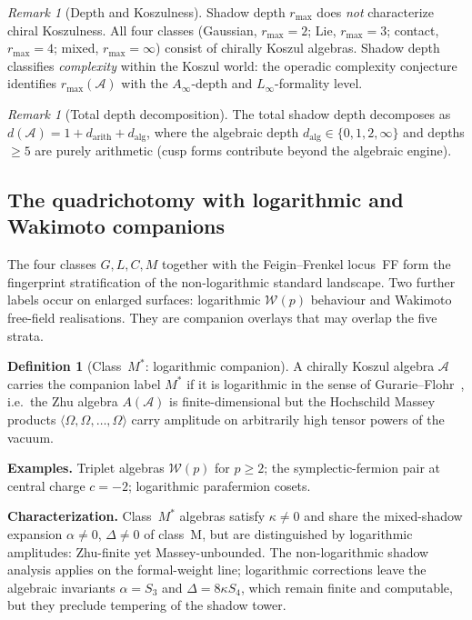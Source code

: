 \documentclass[11pt]{article}
\theoremstyle{plain}
\theoremstyle{definition}
\newtheorem{definition}[theorem]{Definition}
\theoremstyle{remark}
\newtheorem{remark}[theorem]{Remark}
\providecommand{\cA}{\mathcal{A}}
\providecommand{\cW}{\mathcal{W}}
\begin{document}
\medskip

\begin{remark}[Depth and Koszulness]\label{rem:depth-vs-koszulness}
Shadow depth $r_{\max}$ does \emph{not} characterize chiral Koszulness.
All four classes (Gaussian, $r_{\max} = 2$; Lie, $r_{\max} = 3$;
contact, $r_{\max} = 4$; mixed, $r_{\max} = \infty$) consist
of chirally Koszul algebras. Shadow depth classifies \emph{complexity}
within the Koszul world: the operadic complexity conjecture identifies
$r_{\max}(\cA)$ with the $A_\infty$-depth and $L_\infty$-formality level.
\end{remark}

\begin{remark}[Total depth decomposition]\label{rem:total-depth}
The total shadow depth decomposes as
$d(\cA) = 1 + d_{\mathrm{arith}} + d_{\mathrm{alg}}$, where the algebraic depth
$d_{\mathrm{alg}} \in \{0, 1, 2, \infty\}$ and depths $\geq 5$ are
purely arithmetic (cusp forms contribute beyond the algebraic engine).
\end{remark}

\subsection{The quadrichotomy with logarithmic and Wakimoto
companions}
\label{ssec:quadrichotomy-with-companions}

The four classes $G, L, C, M$ together with the Feigin--Frenkel
locus~FF form the fingerprint stratification of the non-logarithmic
standard landscape. Two further labels occur on enlarged surfaces:
logarithmic $\cW(p)$ behaviour and Wakimoto free-field realisations.
They are companion overlays that may overlap the five strata.

\begin{definition}[Class~$M^\ast$: logarithmic companion]
\label{def:class-M-star}
A chirally Koszul algebra $\cA$ carries the companion label
$M^\ast$ if it is logarithmic in the sense of
Gurarie--Flohr~\cite{Gurarie1993,Flohr1996}, i.e.\ the Zhu
algebra $A(\cA)$ is finite-dimensional but the Hochschild Massey
products $\langle \Omega, \Omega, \ldots, \Omega \rangle$ carry
amplitude on arbitrarily high tensor powers of the vacuum.
\end{definition}

\noindent\textbf{Examples.} Triplet algebras $\cW(p)$ for $p \geq
2$; the symplectic-fermion pair at central charge $c = -2$;
logarithmic parafermion cosets.

\noindent\textbf{Characterization.}
Class~$M^\ast$ algebras satisfy $\kappa \neq 0$ and share the
mixed-shadow expansion $\alpha \neq 0$, $\Delta \neq 0$ of
class~M, but are distinguished by logarithmic amplitudes:
Zhu-finite yet Massey-unbounded. The non-logarithmic shadow
analysis applies on the formal-weight line; logarithmic corrections leave
the algebraic invariants $\alpha = S_3$ and $\Delta = 8\kappa
S_4$, which remain finite and computable, but they preclude
tempering of the shadow tower.
\end{document}
